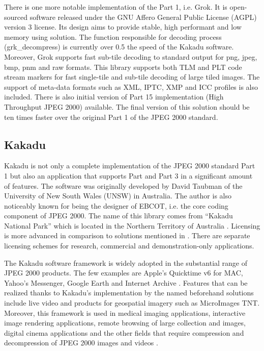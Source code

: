 There is one more notable implementation of the Part 1, i.e. Grok. It is open-sourced software released under
the GNU Affero General Public License (AGPL) version 3 license. Its design aims to provide stable, high
performant and low memory using solution. The function responsible for decoding process (grk\_decompress)
is currently over 0.5 the speed of the Kakadu software. Moreover, Grok supports fast sub-tile decoding
to standard output for png, jpeg, bmp, pnm and raw formats. This library supports both TLM and PLT code stream markers
for fast single-tile and sub-tile decoding of large tiled images. The support of meta-data formats such as
XML, IPTC, XMP and ICC profiles is also included. There is also initial version of Part 15 implementation
(High Throughput JPEG 2000) available. The final version of this solution should be ten times faster over
the original Part 1 of the JPEG 2000 standard.

\subsection{Kakadu} \label{sec:kakadu}

Kakadu is not only a complete implementation of the JPEG 2000 standard Part 1 but also an application
that supports Part and Part 3 in a significant amount of features. The software was originally developed
by David Taubman of the University of New South Wales (UNSW) in Australia. The author is also noticeably
known for being the designer of EBCOT, i.e. the core coding component of JPEG 2000. The name of this library
comes from ``Kakadu National Park'' which is located in the Northern Territory of Australia \cite{jpeg_suite}. Licensing
is more advanced in comparison to solutions mentioned in . There are separate licensing
schemes for research, commercial and demonstration-only applications.

The Kakadu software framework is widely adopted in the substantial range of JPEG 2000 products. The few examples
are Apple's Quicktime v6 for MAC, Yahoo's Messenger, Google Earth and Internet Archive \cite{jpeg_suite}. 
Features that can be realized thanks to Kakadu's implementation by the named beforehand solutions include live video
and products for geospatial imagery such as MicroImages TNT. Moreover, this framework is used in medical imaging applications,
interactive image rendering applications, remote browsing of large collection and images, digital cinema applications
and the other fields that require compression and decompression of JPEG 2000 images and videos \cite{jpeg_suite}.

